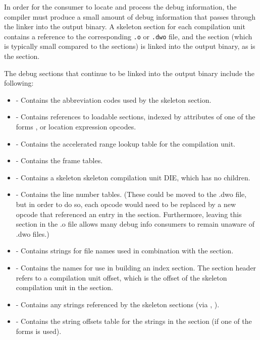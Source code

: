 In order for the consumer to locate and process the debug
information, the compiler must produce a small amount of debug
information that passes through the linker into the output
binary. A skeleton \dotdebuginfo{} section for each compilation unit
contains a reference to the corresponding \texttt{.o} or \texttt{.dwo}
file, and the \dotdebugline{} section (which is typically small
compared to the \dotdebuginfo{} sections) is
linked into the output binary, as is the \dotdebugaddr{} section.

The debug sections that continue to be linked into the
output binary include the following:
\begin{itemize}
\item
\dotdebugabbrev{} - Contains the abbreviation codes used by the
skeleton \dotdebuginfo{} section.
\item
\dotdebugaddr{} - Contains references to loadable sections,
indexed by attributes of one of the forms \DWFORMaddrxXN{}, 
or location expression \DWOPaddrx{} opcodes.
\item
\dotdebugaranges{} - Contains the accelerated range lookup table
for the compilation unit.
\item
\dotdebugframe{} - Contains the frame tables.
\item
\dotdebuginfo{} - Contains a skeleton 
skeleton compilation unit DIE, which has no children.
\item
\dotdebugline{} - Contains the line number tables.
(These could be moved to the .dwo file, but in
order to do so, each \DWLNEsetaddress{} opcode would need to
be replaced by a new opcode that referenced an entry in the
\dotdebugaddr{} section. Furthermore, leaving this section in the
.o file allows many debug info consumers to remain unaware of
.dwo files.)
\item
\dotdebuglinestr{} - Contains strings for file names used in
combination with the \dotdebugline{} section.
\item
\dotdebugnames{} - Contains the names for use in
building an index section. 
The section header refers to a
compilation unit offset, which is the offset of the
skeleton compilation unit in the \dotdebuginfo{} section.

\item
\dotdebugstr{} - Contains any strings referenced by the skeleton
\dotdebuginfo{} sections (via \DWFORMstrp{}, \DWFORMstrxXNor{}).
\item
\dotdebugstroffsets{} - Contains the string offsets table for
the strings in the \dotdebugstr{} section (if one of the forms
\DWFORMstrxXNor{} is used).
\end{itemize}

